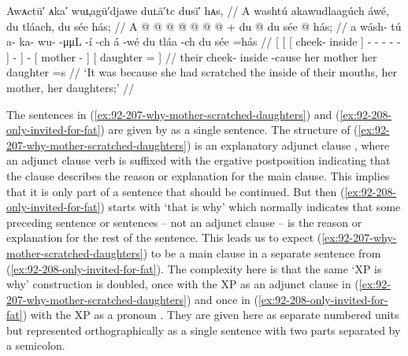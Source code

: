 \ex\label{ex:92-207-why-mother-scratched-daughters}%
%
\begingl
	\glpreamble	Awᴀctū′ ᴀka′ wuʟ̣agū′djawe duʟā′tc dusī′ hᴀs, //
	\glpreamble	A washtú akawudlaagúch áwé, du tláach, du sée hás; //
	\gla	{} {} {} A  @ {} {}
			 @ {} @ {} @ {} @ {} @ {} {} {} {}
		 @ {} +
		{} du  @ {} {}
		{} du sée @ \•hás; {} //
	\glb	{} {} {} a wásh- tú {}
			a- ka- wu-  -μμL -í {} -ch {}
		á -wé
		{} du tláa -ch {}
		{} du sée =hás {} //
	\glc	{}[ {}[ {}[  cheek- inside {}]
			- - -  - - {}]
			- {}]
		 -
		{}[  mother - {}]
		{}[  daughter = {}] //
	\gld	{} {} {} their cheek- inside {}
			 {} {} {} {} {} {} -cause {}
		 {}
		{} her mother {} {}
		{} her daughter =s {} //
	\glft	‘It was because she had scratched the inside of their mouths, her mother, her daughters;’
		//
\endgl
\xe

The sentences in (\ref{ex:92-207-why-mother-scratched-daughters}) and (\ref{ex:92-208-only-invited-for-fat}) are given by \citeauthor{swanton:1909} as a single sentence.
The structure of (\ref{ex:92-207-why-mother-scratched-daughters}) is an explanatory adjunct clause \parencite[“causal clause” in][26]{naish:1966}, where an adjunct clause verb is suffixed with the ergative  postposition indicating that the clause describes the reason or explanation for the main clause.
This implies that it is only part of a sentence that should be continued.
But then (\ref{ex:92-208-only-invited-for-fat}) starts with  ‘that is why’ which normally indicates that some preceding sentence or sentences – not an adjunct clause – is the reason or explanation for the rest of the sentence.
This leads us to expect (\ref{ex:92-207-why-mother-scratched-daughters}) to be a main clause in a separate sentence from (\ref{ex:92-208-only-invited-for-fat}).
The complexity here is that the same  ‘XP is why’ construction is doubled, once with the XP as an adjunct clause in (\ref{ex:92-207-why-mother-scratched-daughters}) and once in (\ref{ex:92-208-only-invited-for-fat}) with the XP as a pronoun .
They are given here as separate numbered units but represented orthographically as a single sentence with two parts separated by a semicolon.

